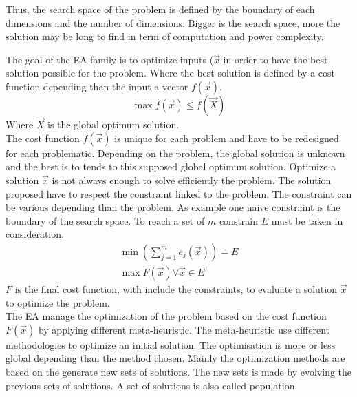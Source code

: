 Thus, the search space of the problem is defined by the boundary of each dimensions and the number of dimensions.  
 Bigger is the search space, more the solution may be long to find in term of computation and power complexity.

 The goal of the EA family is to optimize inputs ($\vec{x}$ in order to have the best solution possible for the problem. Where the best solution is defined by a cost function depending than the input a vector $f(\vec{x})$. 
\begin{equation}
	\max f(\vec{x})\leq f(\vec{X})
\end{equation}
 Where  $\vec{X}$ is the global optimum solution. \\
 The cost function $f(\vec{x})$  is unique for each problem and have to be redesigned for  each problematic. 
Depending on the problem, the global solution is unknown and the best is to tends to this supposed global optimum solution. 
Optimize a solution $\vec{x}$ is not always enough to solve efficiently the problem. 
The solution proposed have to respect the constraint linked to the problem. The constraint can be various depending than the problem. As example one naive constraint is the boundary of the search space. To reach a set of $m$ constrain $E$ must be taken in consideration.
\begin{equation}
 \begin{split}
	\min (\sum^{m}_{j=1} e_j(\vec{x} ) )=E
    \\
	\max F(\vec{x}) \forall \vec{x} \in E 
  \end{split}
\end{equation}  
 $F$ is the final cost function, with include the constraints, to evaluate a solution $\vec{x}$ to optimize the problem. \\
The EA manage the optimization of the problem based on the cost function $F(\vec{x})$ by applying different meta-heuristic. 
The meta-heuristic use different methodologies to optimize an initial solution. The optimisation is more or less global depending than the method chosen. 
Mainly the optimization methods are based on the generate new sets of solutions. The new sets is made by evolving the previous sets of solutions. A set of solutions is also called population. %
